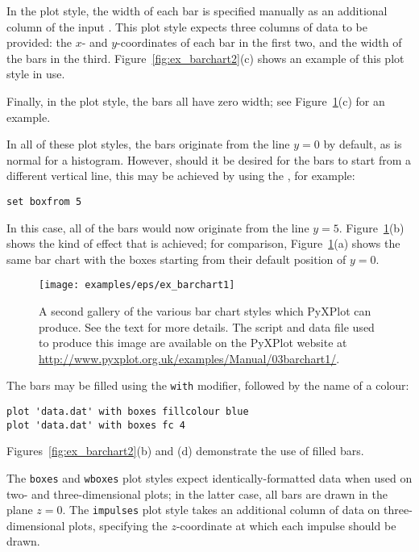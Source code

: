 In the  plot style, the width of each bar is specified manually
as an additional column of the input \datafile.  This plot style expects three
columns of data to be provided: the $x$- and $y$-coordinates of each bar in the
first two, and the width of the bars in the third.
Figure~\ref{fig:ex_barchart2}(c) shows an example of this plot style in use.

Finally, in the  plot style, the bars all have zero width; see
Figure~\ref{fig:ex_barchart1}(c) for an example.

In all of these plot styles, the bars originate from the line $y=0$ by default,
as is normal for a histogram. However, should it be desired for the bars to
start from a different vertical line, this may be achieved by using the
, for example:

\begin{verbatim}
set boxfrom 5
\end{verbatim}

\noindent In this case, all of the bars would now originate from the line
$y=5$. Figure~\ref{fig:ex_barchart1}(b) shows the kind of effect that is
achieved; for comparison, Figure~\ref{fig:ex_barchart1}(a) shows the same bar
chart with the boxes starting from their default position of $y=0$.

\begin{figure}
\begin{center}
\texttt{[image: examples/eps/ex\_barchart1]}
\end{center}
\caption[A second gallery of the various bar chart styles which PyXPlot can
produce]
{A second gallery of the various bar chart styles which PyXPlot can
produce. See the text for more details.  The script and data file used to
produce this image are available on the PyXPlot website at
\protect\url{http://www.pyxplot.org.uk/examples/Manual/03barchart1/}.}
\label{fig:ex_barchart1}
\end{figure}

The bars may be filled using the {\tt with}  modifier,
followed by the name of a colour:

\begin{verbatim}
plot 'data.dat' with boxes fillcolour blue
plot 'data.dat' with boxes fc 4
\end{verbatim}

\noindent Figures~\ref{fig:ex_barchart2}(b) and (d) demonstrate the use of
filled bars.

The {\tt boxes} and {\tt wboxes} plot styles expect identically-formatted data
when used on two- and three-dimensional plots; in the latter case, all bars are
drawn in the plane $z=0$. The {\tt impulses} plot style takes an additional
column of data on three-dimensional plots, specifying the $z$-coordinate at
which each impulse should be drawn.

